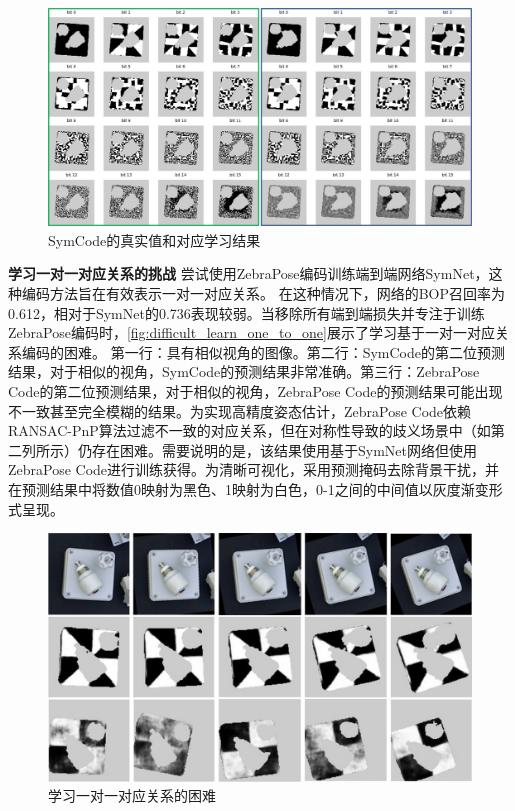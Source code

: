 \begin{figure}[ht]
        \centerline{\includegraphics[width=1.0\textwidth]{figure/symnet/compare_gt_est.jpg}}
        \caption{SymCode的真实值和对应学习结果}
        \label{fig:compare_gt_est}
\end{figure}
\textbf{学习一对一对应关系的挑战 } 尝试使用ZebraPose编码训练端到端网络SymNet，这种编码方法旨在有效表示一对一对应关系。
在这种情况下，网络的BOP召回率为0.612，相对于SymNet的0.736表现较弱。当移除所有端到端损失并专注于训练ZebraPose编码时，\autoref{fig:difficult_learn_one_to_one}展示了学习基于一对一对应关系编码的困难。 第一行：具有相似视角的图像。第二行：SymCode的第二位预测结果，对于相似的视角，SymCode的预测结果非常准确。第三行：ZebraPose Code的第二位预测结果，对于相似的视角，ZebraPose Code的预测结果可能出现不一致甚至完全模糊的结果。为实现高精度姿态估计，ZebraPose Code依赖RANSAC-PnP算法过滤不一致的对应关系，但在对称性导致的歧义场景中（如第二列所示）仍存在困难。需要说明的是，该结果使用基于SymNet网络但使用ZebraPose Code进行训练获得。为清晰可视化，采用预测掩码去除背景干扰，并在预测结果中将数值0映射为黑色、1映射为白色，0-1之间的中间值以灰度渐变形式呈现。

\begin{figure}[ht]
    \centerline{\includegraphics[width=1.0\textwidth]{figure/symnet/difficulty_learn_one_to_one.jpg}}
    \caption{学习一对一对应关系的困难}
    \label{fig:difficult_learn_one_to_one}
\end{figure}

